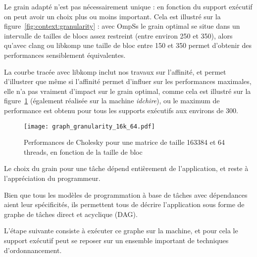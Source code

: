 Le grain adapté n'est pas nécessairement unique : en fonction du support exécutif on peut avoir un choix plus ou moins important. Cela est illustré sur la figure~\ref{fig:context:granularity} : avec OmpSs le grain optimal se situe dans un intervalle de tailles de blocs assez restreint (entre environ 250 et 350), alors qu'avec clang ou libkomp une taille de bloc entre 150 et 350 permet d'obtenir des performances sensiblement équivalentes.

La courbe tracée avec libkomp inclut nos travaux sur l'affinité, et permet d'illustrer que même si l'affinité permet d'influer sur les performances maximales, elle n'a pas vraiment d'impact sur le grain optimal, comme cela est illustré sur la figure~\ref{fig:context:granularity-16k} (également réalisée sur la machine \emph{idchire}), ou le maximum de performance est obtenu pour tous les supports exécutifs aux environs de 300.

\begin{figure}[ht]
  \centering
  \texttt{[image: graph\_granularity\_16k\_64.pdf]}
  \caption{Performances de Cholesky pour une matrice de taille 163384 et 64 threads, en fonction de la taille de bloc}\label{fig:context:granularity-16k}
\end{figure}


Le choix du grain pour une tâche dépend entièrement de l'application, et reste à l'appréciation du programmeur.

\bigskip

Bien que tous les modèles de programmation à base de tâches avec dépendances aient leur spécificités, ils permettent tous de décrire l'application sous forme de graphe de tâches direct et acyclique (DAG).

L'étape suivante consiste à exécuter ce graphe sur la machine, et pour cela le support exécutif peut se reposer sur un ensemble important de techniques d'ordonnancement. 


